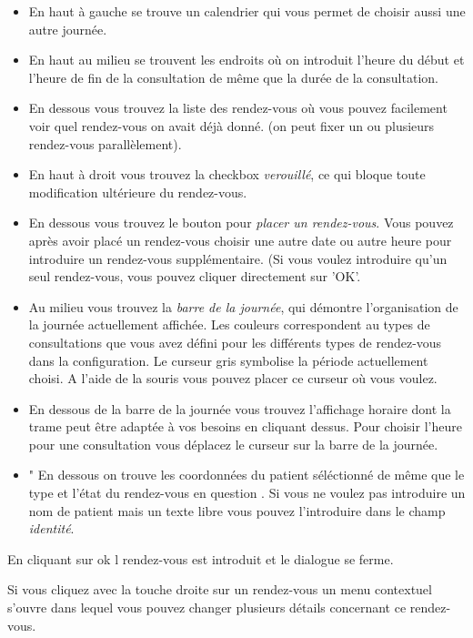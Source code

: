 \begin{itemize}
 \item En haut à gauche se trouve un calendrier qui vous permet de choisir aussi une autre journée.
\item En haut au milieu se trouvent les endroits où on introduit l'heure du début et l'heure de fin de la consultation de même que la durée de la consultation.
\item  En dessous vous trouvez la liste des rendez-vous où vous pouvez facilement voir quel
rendez-vous on avait déjà donné. (on peut fixer un ou plusieurs rendez-vous parallèlement).

\item En haut à droit vous trouvez la checkbox  \textit{verouillé}, ce qui bloque toute modification ultérieure du rendez-vous.
\item  En dessous vous trouvez le bouton pour  \textit{placer un rendez-vous}. Vous pouvez après avoir placé un rendez-vous choisir une autre date ou autre heure pour introduire un rendez-vous supplémentaire. (Si vous voulez introduire qu'un seul rendez-vous, vous pouvez cliquer directement sur 'OK'.
\item Au milieu vous trouvez la \textit{barre de la journée}, qui démontre l'organisation de la journée actuellement affichée. Les couleurs correspondent au types de consultations que vous avez défini pour les différents types de rendez-vous dans la configuration. Le curseur gris symbolise la période actuellement choisi. A l'aide de la souris vous pouvez placer ce curseur où vous voulez.
\item En dessous de la barre de la journée vous trouvez l'affichage horaire dont la trame peut être adaptée à vos besoins en cliquant dessus. Pour choisir l'heure pour une consultation vous déplacez le curseur sur la barre de la journée.


\item "	En dessous on trouve les coordonnées du patient séléctionné de même que le type et l'état du rendez-vous en question . Si vous ne voulez pas introduire un nom de patient mais un texte libre vous pouvez l'introduire dans le champ  \textit{identité}.
\end{itemize}

En cliquant sur ok l rendez-vous est introduit et le dialogue se ferme.


Si vous cliquez avec la touche droite sur un rendez-vous un menu contextuel s'ouvre dans lequel vous pouvez changer plusieurs détails concernant ce rendez-vous.

